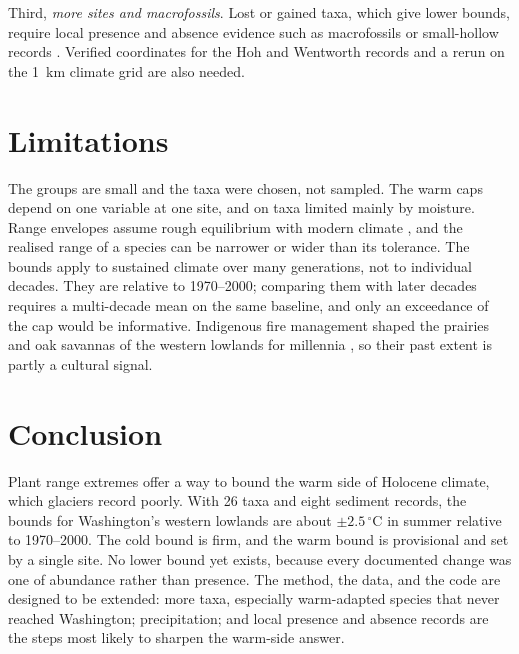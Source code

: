 \documentclass[11pt]{article}
\newcommand{\degC}{\ensuremath{^{\circ}}C}
\begin{document}
Third, \emph{more sites and macrofossils}. Lost or gained taxa, which give lower bounds, require local presence and absence evidence such as macrofossils or small-hollow records \citep{sugimura2008,crausbay2017}. Verified coordinates for the Hoh and Wentworth records and a rerun on the 1~km climate grid are also needed.

\section{Limitations}\label{sec:limits}

The groups are small and the taxa were chosen, not sampled. The warm caps depend on one variable at one site, and on taxa limited mainly by moisture. Range envelopes assume rough equilibrium with modern climate \citep{svenningsandel2013}, and the realised range of a species can be narrower or wider than its tolerance. The bounds apply to sustained climate over many generations, not to individual decades. They are relative to 1970--2000; comparing them with later decades requires a multi-decade mean on the same baseline, and only an exceedance of the cap would be informative. Indigenous fire management shaped the prairies and oak savannas of the western lowlands for millennia \citep{leopoldboyd1999,pellattgedalof2014}, so their past extent is partly a cultural signal.

\section{Conclusion}

Plant range extremes offer a way to bound the warm side of Holocene climate, which glaciers record poorly. With 26 taxa and eight sediment records, the bounds for Washington's western lowlands are about $\pm2.5$\,\degC{} in summer relative to 1970--2000. The cold bound is firm, and the warm bound is provisional and set by a single site. No lower bound yet exists, because every documented change was one of abundance rather than presence. The method, the data, and the code are designed to be extended: more taxa, especially warm-adapted species that never reached Washington; precipitation; and local presence and absence records are the steps most likely to sharpen the warm-side answer.



\end{document}

